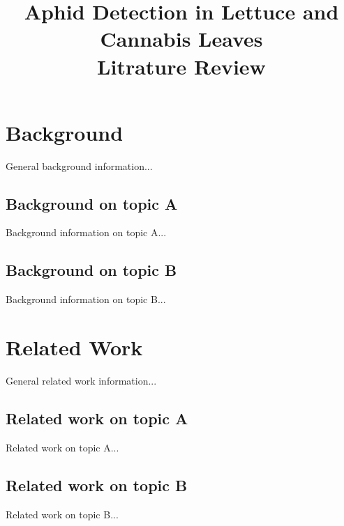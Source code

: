 \documentclass{article}
\title{Aphid Detection in Lettuce and Cannabis Leaves \\ Litrature Review}
\begin{document}
\maketitle

\section{Background}
General background information...

\subsection{Background on topic A}
Background information on topic A...

\subsection{Background on topic B}
Background information on topic B...

\section{Related Work}
General related work information...

\subsection{Related work on topic A}
Related work on topic A...

\subsection{Related work on topic B}
Related work on topic B...



\end{document}
